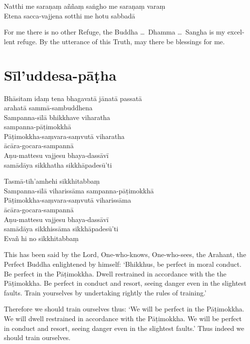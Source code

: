 Natthi me saraṇaṃ aññaṃ saṅgho me saraṇaṃ varaṃ\\
Etena sacca-vajjena sotthi me hotu sabbadā


\begin{english}
  For me there is no other Refuge, the Buddha \ldots\ Dhamma \ldots\ Sangha is
  my excellent refuge. By the utterance of this Truth, may there be blessings
  for me.
\end{english}

\section{Sīl'uddesa-pāṭha}

\begin{leader}
\end{leader}


Bhāsitam idaṃ tena bhagavatā jānatā passatā\\\vin arahatā sammā-sambuddhena\\
Sampanna-sīlā bhikkhave viharatha\\\vin sampanna-pāṭimokkhā\\
Pāṭimokkha-saṃvara-saṃvutā viharatha\\\vin ācāra-gocara-sampannā\\
Aṇu-mattesu vajjesu bhaya-dassāvī\\\vin samādāya sikkhatha sikkhāpadesū'ti

Tasmā-tih'amhehi sikkhitabbaṃ\\
Sampanna-sīlā viharissāma sampanna-pāṭimokkhā\\
Pāṭimokkha-saṃvara-saṃvutā viharissāma\\\vin ācāra-gocara-sampannā\\
Aṇu-mattesu vajjesu bhaya-dassāvī\\\vin samādāya sikkhissāma sikkhāpadesū'ti\\
Evañ hi no sikkhitabbaṃ


\begin{english}
  \setlength{\parskip}{8pt}%
  This has been said by the Lord, One-who-knows, One-who-sees, the Arahant, the
  Perfect Buddha enlightened by himself: `Bhikkhus, be perfect in moral
  conduct. Be perfect in the Pāṭimokkha. Dwell restrained in accordance with the
  the Pāṭimokkha. Be perfect in conduct and resort, seeing danger even in the
  slightest faults. Train yourselves by undertaking rightly the rules of training.'

  Therefore we should train ourselves thus: `We will be perfect in the
  Pāṭimokkha. We will dwell restrained in accordance with the Pāṭimokkha. We
  will be perfect in conduct and resort, seeing danger even in the slightest
  faults.' Thus indeed we should train ourselves.
\end{english}

